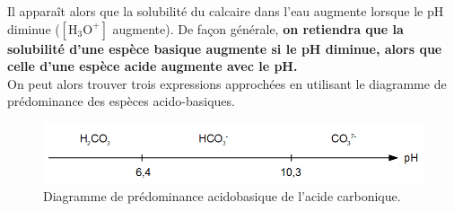 \documentclass[11pt,a4paper]{report}
\begin{document}
Il apparaît alors que la solubilité du calcaire dans l'eau augmente lorsque le pH diminue ($[\text{H}_3\text{O}^+]$ augmente). De façon générale, \textbf{on retiendra que la solubilité d'une espèce basique augmente si le pH diminue, alors que celle d'une espèce acide augmente avec le pH.}\\

On peut alors trouver trois expressions approchées en utilisant le diagramme de prédominance des espèces acido-basiques.

\begin{figure}[h!]
	\begin{center}
  		\includegraphics[scale = 0.4]{predo_carbonate.png}
		\caption{Diagramme de prédominance acidobasique de l'acide carbonique.}
	\end{center}
\end{figure}
\end{document}
